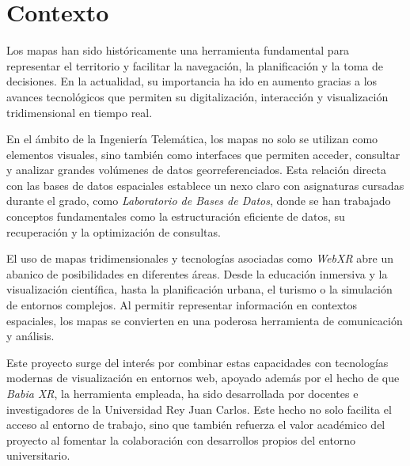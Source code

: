 \documentclass[a4paper, 12pt]{book}
\begin{document}


\section{Contexto}
\label{sec:contexto}

Los mapas han sido históricamente una herramienta fundamental para representar el territorio y facilitar la navegación, la planificación y la toma de decisiones. En la actualidad, su importancia ha ido en aumento gracias a los avances tecnológicos que permiten su digitalización, interacción y visualización tridimensional en tiempo real.

En el ámbito de la Ingeniería Telemática, los mapas no solo se utilizan como elementos visuales, sino también como interfaces que permiten acceder, consultar y analizar grandes volúmenes de datos georreferenciados. Esta relación directa con las bases de datos espaciales establece un nexo claro con asignaturas cursadas durante el grado, como \textit{ Laboratorio de Bases de Datos}, donde se han trabajado conceptos fundamentales como la estructuración eficiente de datos, su recuperación y la optimización de consultas.

El uso de mapas tridimensionales y tecnologías asociadas como \textit{WebXR} abre un abanico de posibilidades en diferentes áreas. Desde la educación inmersiva y la visualización científica, hasta la planificación urbana, el turismo o la simulación de entornos complejos. Al permitir representar información en contextos espaciales, los mapas se convierten en una poderosa herramienta de comunicación y análisis.

Este proyecto surge del interés por combinar estas capacidades con tecnologías modernas de visualización en entornos web, apoyado además por el hecho de que \textit{Babia XR}, la herramienta empleada, ha sido desarrollada por docentes e investigadores de la Universidad Rey Juan Carlos. Este hecho no solo facilita el acceso al entorno de trabajo, sino que también refuerza el valor académico del proyecto al fomentar la colaboración con desarrollos propios del entorno universitario.


\end{document}
